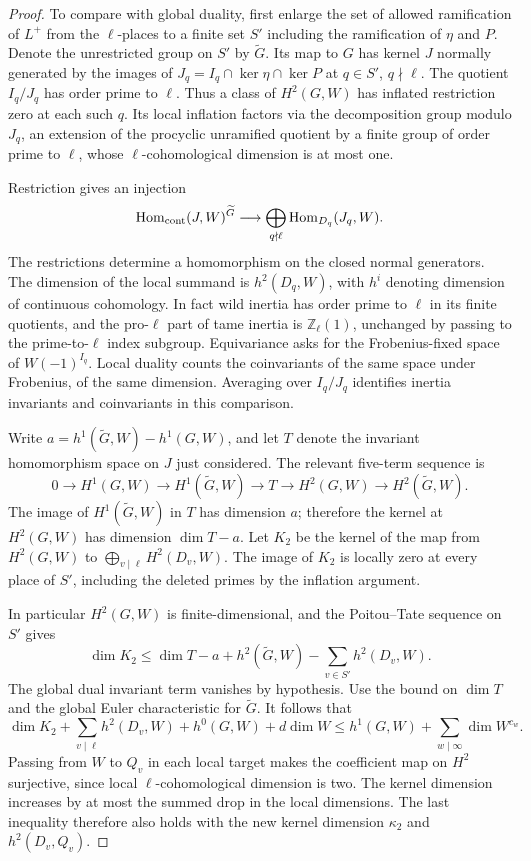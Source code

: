 \begin{proof}
To compare with global duality, first enlarge the set of
allowed ramification of \(L^+\) from the \(\ell\)-places to a
finite set \(S'\) including the ramification of \(\eta\) and
\(P\). Denote the unrestricted group on \(S'\) by \(\widetilde G\).
Its map to \(G\) has kernel \(J\) normally generated by the
images of \(J_q=I_q\cap\ker\eta\cap\ker P\) at
\(q\in S'\), \(q\nmid\ell\). The quotient \(I_q/J_q\) has order
prime to \(\ell\). Thus a class of \(H^2(G,W)\) has inflated
restriction zero at each such \(q\). Its local inflation
factors via the decomposition group modulo \(J_q\), an extension
of the procyclic unramified quotient by a finite group of
order prime to \(\ell\), whose \(\ell\)-cohomological dimension
is at most one.

Restriction gives an injection
\[
 \operatorname{Hom}_{\rm cont}(J,W)^{\widetilde G}
 \longrightarrow \bigoplus_{q\nmid\ell}\operatorname{Hom}_{D_q}(J_q,W).
\]
The restrictions determine a homomorphism on the closed
normal generators. The dimension of the local summand is
\(h^2(D_q,W)\), with \(h^i\) denoting dimension of continuous
cohomology. In fact wild inertia has order prime to \(\ell\)
in its finite quotients, and the pro-\(\ell\) part of tame
inertia is \(\mathbb Z_\ell(1)\), unchanged by passing to
the prime-to-\(\ell\) index subgroup. Equivariance asks for the
Frobenius-fixed space of \(W(-1)^{I_q}\). Local duality counts
the coinvariants of the same space under Frobenius, of the
same dimension. Averaging over \(I_q/J_q\) identifies inertia
invariants and coinvariants in this comparison.

Write \(a=h^1(\widetilde G,W)-h^1(G,W)\), and let \(T\)
denote the invariant homomorphism space on \(J\) just
considered. The relevant five-term sequence is
\[
 0\to H^1(G,W)\to H^1(\widetilde G,W)\to T
 \to H^2(G,W)\to H^2(\widetilde G,W).
\]
The image of \(H^1(\widetilde G,W)\) in \(T\) has dimension \(a\);
therefore the kernel at \(H^2(G,W)\) has dimension \(\dim T-a\).
Let \(K_2\) be the kernel of the map from \(H^2(G,W)\) to
\(\bigoplus_{v\mid\ell}H^2(D_v,W)\).
The image of \(K_2\) is locally zero at every place of
\(S'\), including the deleted primes by the inflation
argument.

In particular \(H^2(G,W)\) is finite-dimensional,
and the Poitou--Tate sequence on \(S'\) gives
\[
 \dim K_2 \le \dim T-a+h^2(\widetilde G,W)
                         -\sum_{v\in S'}h^2(D_v,W).
\]
The global dual invariant term vanishes by hypothesis.
Use the bound on \(\dim T\) and the global Euler characteristic
for \(\widetilde G\). It follows that
\[
 \dim K_2+\sum_{v\mid\ell}h^2(D_v,W)
        +h^0(G,W)+d\dim W
 \le h^1(G,W)+\sum_{w\mid\infty}\dim W^{c_w}.
\]
Passing from \(W\) to \(Q_v\) in each local target makes the
coefficient map on \(H^2\) surjective, since local
\(\ell\)-cohomological dimension is two. The kernel dimension
increases by at most the summed drop in the local dimensions.
The last inequality therefore also holds with the new kernel
dimension \(\kappa_2\) and \(h^2(D_v,Q_v)\).


\end{proof}
